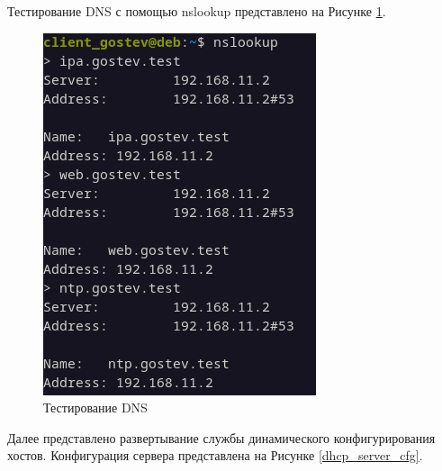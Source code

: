 \documentclass[14pt, a4paper]{extarticle}
\numberwithin{equation}{section}
\begin{document}
Тестирование DNS с помощью nslookup представлено на Рисунке \ref{fig:nslookup}.
\begin{figure}[H]
        \centering
        \includegraphics[scale=1]{services/dns/nslookup.png}
        \caption{Тестирование DNS}
        \label{fig:nslookup}
\end{figure}


Далее представлено развертывание службы динамического конфигурирования хостов.
Конфигурация сервера представлена на Рисунке \ref{dhcp_server_cfg}.
\end{document}
